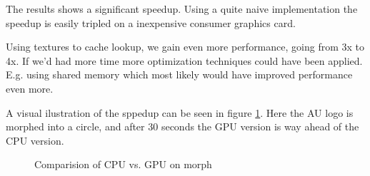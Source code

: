 The results shows a significant speedup. Using a quite naive
implementation the speedup is easily tripled on a inexpensive consumer
graphics card.

Using textures to cache lookup, we gain even more performance, going
from 3x to 4x. If we'd had more time more optimization techniques
could have been applied. E.g. using shared memory which most likely
would have improved performance even more.

A visual ilustration of the sppedup can be seen in figure
\ref{fig:cudaComp}. Here the AU logo is morphed into a circle, and
after 30 seconds the GPU version is way ahead of the CPU version.

\begin{figure}[h]
  \centering
  \caption{Comparision of CPU vs. GPU on morph}
  \label{fig:cudaComp}
\end{figure}



